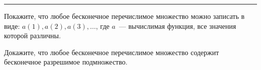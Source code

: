 \setcounter{curtask}{7}



\hrule
\vspace{0.5cm}

\begin{ptask}{4}
    Покажите, что любое бесконечное перечислимое множество можно
    записать в виде: ${a(1), a(2), a(3), \dots}$, где $a$~---
    вычислимая функция, все значения которой различны.
\end{ptask}

\begin{ptask}{5}
    Докажите, что любое бесконечное перечислимое множество содержит
    бесконечное разрешимое подмножество.
\end{ptask}